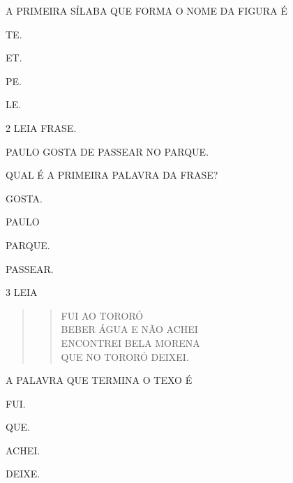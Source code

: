 A PRIMEIRA SÍLABA QUE FORMA O NOME DA FIGURA É

\begin{escolha}
\item TE.

\item ET.

\item PE.

\item LE.
\end{escolha}

\pagebreak

\num{2} LEIA FRASE.

\begin{myquote}
PAULO GOSTA DE PASSEAR NO PARQUE.
\end{myquote}

QUAL É A PRIMEIRA PALAVRA DA FRASE?

\begin{escolha}
\item GOSTA.

\item PAULO

\item PARQUE.

\item PASSEAR.
\end{escolha}


\num{3} LEIA

\begin{quote}
\begin{verse}
FUI AO TORORÓ\\
BEBER ÁGUA E NÃO ACHEI\\
ENCONTREI BELA MORENA\\
QUE NO TORORÓ DEIXEI.
\end{verse}
\end{quote}

A PALAVRA QUE TERMINA O TEXO É

\begin{escolha}
\item FUI.

\item QUE.

\item ACHEI.

\item DEIXE.
\end{escolha}

